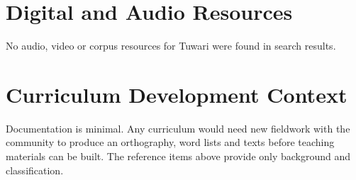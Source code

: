 \documentclass[12pt]{article}
\begin{document}
\section{Digital and Audio Resources}
No audio, video or corpus resources for Tuwari were found in search results.

\section{Curriculum Development Context}
Documentation is minimal. Any curriculum would need new fieldwork with the community to produce an orthography, word lists and texts before teaching materials can be built. The reference items above provide only background and classification.
\end{document}
